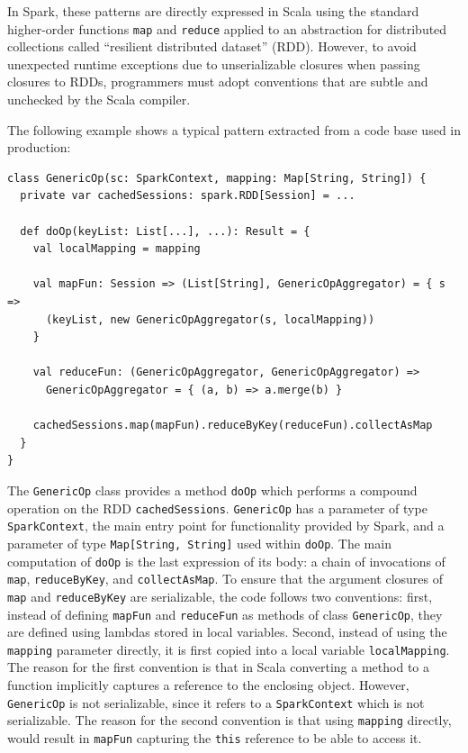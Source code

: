 \documentclass{llncs}
\begin{document}
In Spark, these patterns are directly expressed in Scala using the standard higher-order functions \verb|map| and \verb|reduce| applied to an abstraction for distributed collections called ``resilient distributed dataset'' (RDD). However, to avoid unexpected runtime exceptions due to unserializable closures when passing closures to RDDs, programmers must adopt conventions that are subtle and unchecked by the Scala compiler.

The following example shows a typical pattern extracted from a code base used in production:

\begin{lstlisting}
class GenericOp(sc: SparkContext, mapping: Map[String, String]) {
  private var cachedSessions: spark.RDD[Session] = ...

  def doOp(keyList: List[...], ...): Result = {
    val localMapping = mapping

    val mapFun: Session => (List[String], GenericOpAggregator) = { s =>
      (keyList, new GenericOpAggregator(s, localMapping))
    }

    val reduceFun: (GenericOpAggregator, GenericOpAggregator) =>
      GenericOpAggregator = { (a, b) => a.merge(b) }

    cachedSessions.map(mapFun).reduceByKey(reduceFun).collectAsMap
  }
}
\end{lstlisting}
\noindent
The \verb|GenericOp| class provides a method \verb|doOp| which performs a compound operation on the RDD \verb|cachedSessions|. \verb|GenericOp| has a parameter of type \verb|SparkContext|, the main entry point for functionality provided by Spark, and a parameter of type \verb|Map[String, String]| used within \verb|doOp|. The main computation of \verb|doOp| is the last expression of its body: a chain of invocations of \verb|map|, \verb|reduceByKey|, and \verb|collectAsMap|. To ensure that the argument closures of \verb|map| and \verb|reduceByKey| are serializable, the code follows two conventions: first, instead of defining \verb|mapFun| and \verb|reduceFun| as methods of class \verb|GenericOp|, they are defined using lambdas stored in local variables. Second, instead of using the \verb|mapping| parameter directly, it is first copied into a local variable \verb|localMapping|. The reason for the first convention is that in Scala converting a method to a function implicitly captures a reference to the enclosing object. However, \verb|GenericOp| is not serializable, since it refers to a \verb|SparkContext| which is not serializable. The reason for the second convention is that using \verb|mapping| directly, would result in \verb|mapFun| capturing the \verb|this| reference to be able to access it.
\end{document}
